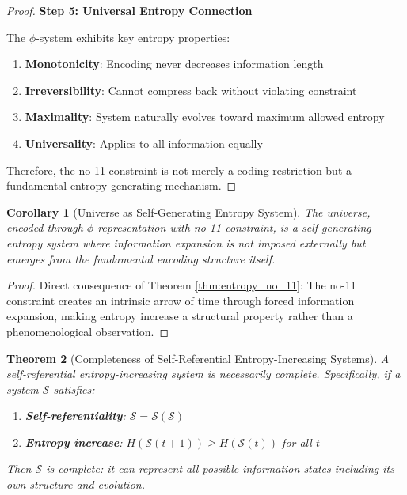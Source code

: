 \documentclass[12pt,letterpaper]{article}
\newtheorem{theorem}{Theorem}[section]
\newtheorem{corollary}[theorem]{Corollary}
\begin{document}
\begin{proof}
\textbf{Step 5: Universal Entropy Connection}

The $\phi$-system exhibits key entropy properties:
\begin{enumerate}
\item \textbf{Monotonicity}: Encoding never decreases information length
\item \textbf{Irreversibility}: Cannot compress back without violating constraint
\item \textbf{Maximality}: System naturally evolves toward maximum allowed entropy
\item \textbf{Universality}: Applies to all information equally
\end{enumerate}

Therefore, the no-11 constraint is not merely a coding restriction but a fundamental entropy-generating mechanism.
\end{proof}

\begin{corollary}[Universe as Self-Generating Entropy System]
The universe, encoded through $\phi$-representation with no-11 constraint, is a self-generating entropy system where information expansion is not imposed externally but emerges from the fundamental encoding structure itself.
\end{corollary}

\begin{proof}
Direct consequence of Theorem \ref{thm:entropy_no_11}: The no-11 constraint creates an intrinsic arrow of time through forced information expansion, making entropy increase a structural property rather than a phenomenological observation.
\end{proof}

\begin{theorem}[Completeness of Self-Referential Entropy-Increasing Systems]
\label{thm:self_ref_complete}
A self-referential entropy-increasing system is necessarily complete. Specifically, if a system $\mathcal{S}$ satisfies:
\begin{enumerate}
\item \textbf{Self-referentiality}: $\mathcal{S} = \mathcal{S}(\mathcal{S})$ 
\item \textbf{Entropy increase}: $H(\mathcal{S}(t+1)) \geq H(\mathcal{S}(t))$ for all $t$
\end{enumerate}
Then $\mathcal{S}$ is complete: it can represent all possible information states including its own structure and evolution.
\end{theorem}
\end{document}
